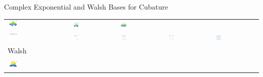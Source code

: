 \documentclass[11pt,compress,xcolor={usenames,dvipsnames},aspectratio=169]{beamer}
\begin{document}
\begin{frame}{Complex Exponential and Walsh Bases for Cubature}
\begin{tabular}{>{\centering}m{}>{\centering}m{}>{\centering}m{}>{\centering}m{}>{\centering}m{}}
\includegraphics[width =0.18\textwidth]{ProgramsImages/CosineSine_Degree_1_3.png}  &
\includegraphics[width =0.18\textwidth]{ProgramsImages/CosineSine_Degree_2_2.png}  &
\includegraphics[width =0.18\textwidth]{ProgramsImages/CosineSine_Degree_2_3.png} 
\tabularnewline[0ex]
		\includegraphics[width =0.18\textwidth]{ProgramsImages/Walsh_Degree_0.png}  &
\includegraphics[width =0.18\textwidth]{ProgramsImages/Walsh_Degree_1.png}  &
\includegraphics[width =0.18\textwidth]{ProgramsImages/Walsh_Degree_2.png}  &
\includegraphics[width =0.18\textwidth]{ProgramsImages/Walsh_Degree_3.png}  &
\includegraphics[width =0.18\textwidth]{ProgramsImages/Walsh_Degree_4.png} 
\tabularnewline[-7ex]
Walsh \tabularnewline
\tabularnewline
\includegraphics[width =0.18\textwidth]{ProgramsImages/Walsh_Degree_1_1.png}  &

\end{tabular}
\end{frame}
\end{document}
